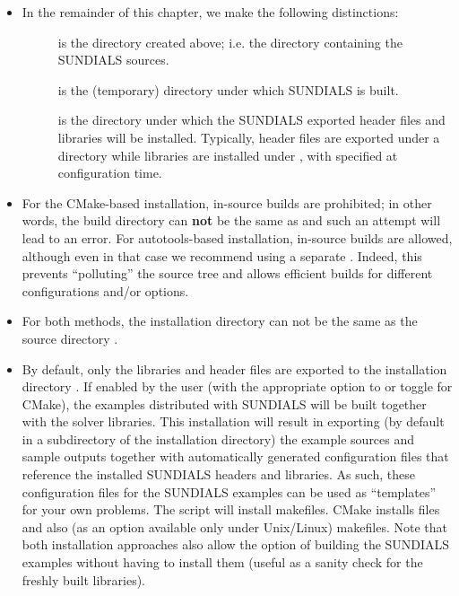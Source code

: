 \documentclass[letterpaper,10pt,english]{sphinxmanual}
\begin{document}
\begin{itemize}
\item {} 
In the remainder of this chapter, we make the following
distinctions:
\begin{description}
\item[{}] \leavevmode
is the directory  created above; i.e. the
directory containing the SUNDIALS sources.

\item[{}] \leavevmode
is the (temporary) directory under which SUNDIALS is built.

\item[{}] \leavevmode
is the directory under which the SUNDIALS exported
header files and libraries will be installed. Typically, header
files are exported under a directory  while
libraries are installed under , with 
specified at configuration time.

\end{description}

\item {} 
For the CMake-based installation, in-source builds are prohibited;
in other words, the build directory  can \textbf{not} be the
same as  and such an attempt will lead to an error.  For
autotools-based installation, in-source builds are allowed, although
even in that case we recommend using a separate . Indeed,
this prevents ``polluting'' the source tree and allows efficient
builds for different configurations and/or options.

\item {} 
For both methods, the installation directory  can not be
the same as the source directory .

\item {} 
By default, only the libraries and header files are exported to the
installation directory .  If enabled by the user (with the
appropriate option to  or toggle for CMake), the
examples distributed with SUNDIALS will be built together with the
solver libraries.  This installation will result in exporting (by
default in a subdirectory of the installation directory) the example
sources and sample outputs together with automatically generated
configuration files that reference the installed SUNDIALS headers
and libraries.  As such, these configuration files for the
SUNDIALS examples can be used as ``templates'' for your own
problems. The  script will install makefiles. CMake
installs  files and also (as an option available
only under Unix/Linux) makefiles. Note that both installation
approaches also allow the option of building the SUNDIALS examples
without having to install them (useful as a sanity check
for the freshly built libraries).


\end{itemize}
\end{document}
